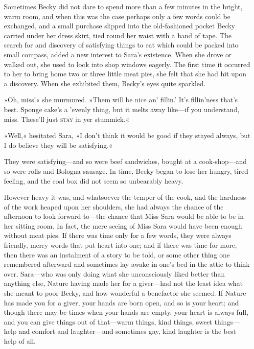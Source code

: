 Sometimes Becky did not dare to spend more than a few minutes in the bright, warm room, and when this was the case perhaps only a few words could be exchanged, and a small purchase slipped into the old-fashioned pocket Becky carried under her dress skirt, tied round her waist with a band of tape. The search for and discovery of satisfying things to eat which could be packed into small compass, added a new interest to Sara's existence. When she drove or walked out, she used to look into shop windows eagerly. The first time it occurred to her to bring home two or three little meat pies, she felt that she had hit upon a discovery. When she exhibited them, Becky's eyes quite sparkled.

»Oh, miss!« she murmured. »Them will be nice an' fillin.' It's fillin'ness that's best. Sponge cake's a 'evenly thing, but it melts away like—if you understand, miss. These'll just \textsc{stay} in yer stummick.«

»Well,« hesitated Sara, »I don't think it would be good if they stayed always, but I do believe they will be satisfying.«

They were satisfying—and so were beef sandwiches, bought at a cook-shop—and so were rolls and Bologna sausage. In time, Becky began to lose her hungry, tired feeling, and the coal box did not seem so unbearably heavy.

However heavy it was, and whatsoever the temper of the cook, and the hardness of the work heaped upon her shoulders, she had always the chance of the afternoon to look forward to—the chance that Miss Sara would be able to be in her sitting room. In fact, the mere seeing of Miss Sara would have been enough without meat pies. If there was time only for a few words, they were always friendly, merry words that put heart into one; and if there was time for more, then there was an instalment of a story to be told, or some other thing one remembered afterward and sometimes lay awake in one's bed in the attic to think over. Sara—who was only doing what she unconsciously liked better than anything else, Nature having made her for a giver—had not the least idea what she meant to poor Becky, and how wonderful a benefactor she seemed. If Nature has made you for a giver, your hands are born open, and so is your heart; and though there may be times when your hands are empty, your heart is always full, and you can give things out of that—warm things, kind things, sweet things—help and comfort and laughter—and sometimes gay, kind laughter is the best help of all.

